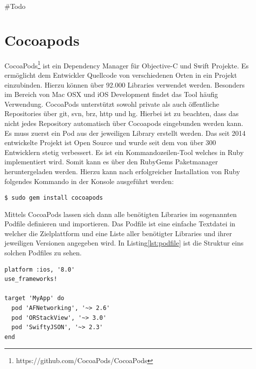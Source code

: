     \#Todo
    \cite{Cahill2021}
    \cite{Varma2019}


    \newpage
    \section{Cocoapods}\label{sec:cocoapods}
    CocoaPods\footnote{https://github.com/CocoaPods/CocoaPods} ist ein Dependency Manager für Objective-C und Swift Projekte.
    Es ermöglicht dem Entwickler Quellcode von verschiedenen Orten in ein Projekt einzubinden.
    Hierzu können über 92.000 Libraries verwendet werden.
    Besonders im Bereich von Mac OSX und iOS Development findet das Tool häufig Verwendung.
    CocoaPods unterstützt sowohl private als auch öffentliche Repositories über git, svn, brz, http und hg.
    Hierbei ist zu beachten, dass das nicht jedes Repository automatisch über Cocoapods eingebunden werden kann.
    Es muss zuerst ein Pod aus der jeweiligen Library erstellt werden.
    Das seit 2014 entwickelte Projekt ist Open Source und wurde seit dem von über 300 Entwicklern stetig verbessert.
    Es ist ein Kommandozeilen-Tool welches in Ruby implementiert wird.
    Somit kann es über den RubyGems Paketmanager heruntergeladen werden.
    Hierzu kann nach erfolgreicher Installation von Ruby folgendes Kommando in der Konsole ausgeführt werden:
    \begin{lstlisting}[language=bash,label={lst:cocoapods}]
        $ sudo gem install cocoapods
    \end{lstlisting}
    Mittels CocoaPods lassen sich dann alle benötigten Libraries im sogenannten Podfile definieren und importieren.
    Das Podfile ist eine einfache Textdatei in welcher die Zielplattform und eine Liste aller benötigter Libraries und ihrer jeweiligen Versionen angegeben wird.
    In Listing\ref{lst:podfile} ist die Struktur eins solchen Podfiles zu sehen.
    ~\cite{cocoapods1, cocoapods2, cocoapods3}
    \begin{lstlisting}[language={},firstnumber=1,label={lst:podfile},caption={Beispielstuktur eines Podfiles},captionpos=t]
platform :ios, '8.0'
use_frameworks!

target 'MyApp' do
  pod 'AFNetworking', '~> 2.6'
  pod 'ORStackView', '~> 3.0'
  pod 'SwiftyJSON', '~> 2.3'
end
    \end{lstlisting}


